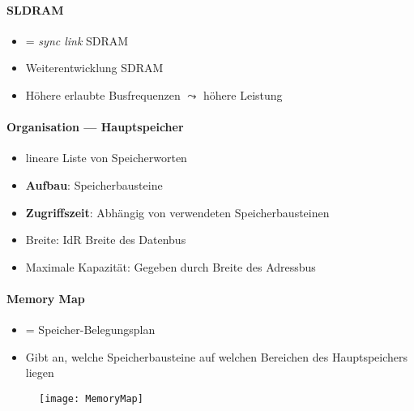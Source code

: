 \paragraph{SLDRAM}
\begin{itemize}
	\item = \emph{sync link} SDRAM
	\item Weiterentwicklung SDRAM
	\item Höhere erlaubte Busfrequenzen \( \leadsto \) höhere Leistung
\end{itemize}

\paragraph{Organisation --- Hauptspeicher}
\begin{itemize}
	\item lineare Liste von Speicherworten
	\item \textbf{Aufbau}: Speicherbausteine
	\item \textbf{Zugriffszeit}: Abhängig von verwendeten Speicherbausteinen
	\item Breite: IdR Breite des Datenbus
	\item Maximale Kapazität: Gegeben durch Breite des Adressbus
\end{itemize}

\paragraph{Memory Map}
\begin{itemize}
	\item = Speicher-Belegungsplan
	\item Gibt an, welche Speicherbausteine auf welchen Bereichen des Hauptspeichers liegen
\end{itemize}
\begin{figure}[H]\centering\label{MemoryMap}\texttt{[image: MemoryMap]}\end{figure}